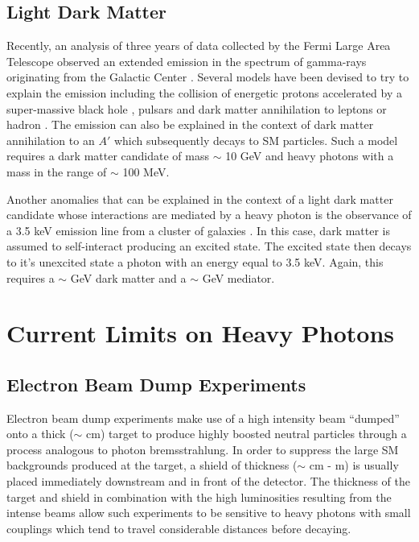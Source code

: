 \subsection{Light Dark Matter}

Recently, an analysis of three years of data collected by the Fermi Large Area
Telescope observed an extended emission in the spectrum of gamma-rays 
originating from the Galactic Center \cite{}.  Several models have been 
devised to try to explain the emission including the collision of energetic 
protons accelerated by a super-massive black hole \cite{}, pulsars \cite{} and
dark matter annihilation to leptons or hadron \cite{}.  The emission can also
be explained in the context of dark matter annihilation to an $A'$ which 
subsequently decays to SM particles.  Such a model requires a dark matter 
candidate of mass $\sim$ 10 GeV and heavy photons with a mass in the range 
of $\sim$ 100 MeV. 

Another anomalies that can be explained in the context of a light dark matter
candidate whose interactions are mediated by a heavy photon is the observance
of a 3.5 keV emission line from a cluster of galaxies \cite{}.  In this case, 
dark matter is assumed to self-interact producing an excited state.  The excited
state then decays to it's unexcited state a photon with an energy equal to 3.5 keV.
Again, this requires a $\sim$ GeV dark matter and a $\sim$ GeV mediator.

\section{Current Limits on Heavy Photons}

\subsection{Electron Beam Dump Experiments}

Electron beam dump experiments make use of a high intensity beam ``dumped'' onto
a thick ($\sim$ cm) target to produce highly boosted neutral particles through a 
process analogous to photon bremsstrahlung.  In order to suppress the large
SM backgrounds produced at the target, a shield of thickness ($\sim$ cm - m)
is usually placed immediately downstream and in front of the detector.
The thickness of the target and shield in combination with the high luminosities
resulting from the intense beams allow such 
experiments to be sensitive to heavy photons with small couplings which tend to
travel considerable distances before decaying.  

